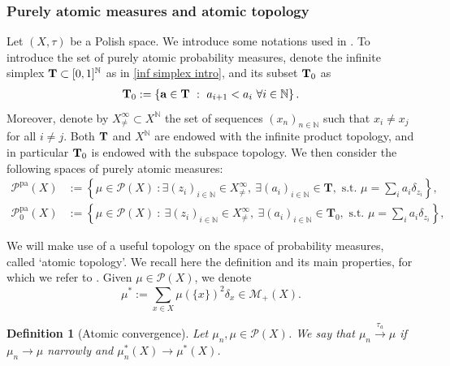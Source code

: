 \documentclass[10pt,leqno]{amsart}
\numberwithin{equation}{section}
\newtheorem{df}[teorema]{Definition}
\newcommand{\N}{\mathbb{N}}
\newcommand{\PP}{\mathcal{P}}
\begin{document}
\subsubsection{Purely atomic measures and atomic topology}\label{subsec: atomic topology}
Let $(X,\tau)$ be a Polish space. We introduce some notations used in \cite{dello2022dirichlet, delloschiavo2024massive}. To introduce the set of purely atomic probability measures, denote the infinite simplex $\bold{T}\subset [0,1]^\N$ as in \eqref{inf simplex intro}, and its subset $\bold{T}_0$ as
\begin{equation}\label{eq: infinite simplex}
\begin{aligned}
    \bold{T}_0 := \left\{ \bold{a} \in \bold{T} \ : \ a_{i+1}<a_i \ \forall i \in \N  \right\}.
\end{aligned}
\end{equation}
Moreover, denote by $X^\infty_{\neq} \subset X^\N$ the set of sequences $(x_n)_{n\in \N}$ such that $x_i\neq x_j$ for all $i\neq j$. Both $\bold{T}$ and $X^\N$ are endowed with the infinite product topology, and in particular $\bold{T}_0$ is endowed with the subspace topology. 
We then consider the following spaces of purely atomic measures:
\begin{equation}
    \begin{aligned}
        \PP^{\operatorname{pa}}(X) & := \left\{\mu\in \PP(X) \ : \exists(z_i)_{i\in \N} \in X^\infty_{\neq}, \ \exists(a_i)_{i\in \N} \in \mathbf{T}, \text{ s.t. } \mu = \sum_i a_i \delta_{z_i}\right\},
    \\
        \PP_0^{\operatorname{pa}}(X) & := \left\{\mu\in \PP(X) \ : \ \exists(z_i)_{i\in \N} \in X^\infty_{\neq}, \ \exists(a_i)_{i\in \N} \in \mathbf{T}_0, \text{ s.t. } \mu = \sum_i a_i \delta_{z_i}\right\},
        \end{aligned}
    \end{equation}

We will make use of a useful topology on the space of probability measures, called `atomic topology'. We recall here the definition and its main properties, for which we refer to \cite[§2]{ethier1994convergence}. Given $\mu\in \PP(X)$, we denote 
\begin{equation}
    \mu^*:= \sum_{x\in X} \mu(\{x\})^2 \delta_x \in \mathcal{M}_+(X).
\end{equation}

\begin{df}[Atomic convergence]
    Let $\mu_n,\mu\in \mathcal{P}(X)$. We say that $\mu_n \overset{\tau_a}{\longrightarrow} \mu$ if $\mu_n\to\mu$ narrowly and $\mu_n^*(X) \to \mu^*(X)$.
\end{df}
\end{document}
